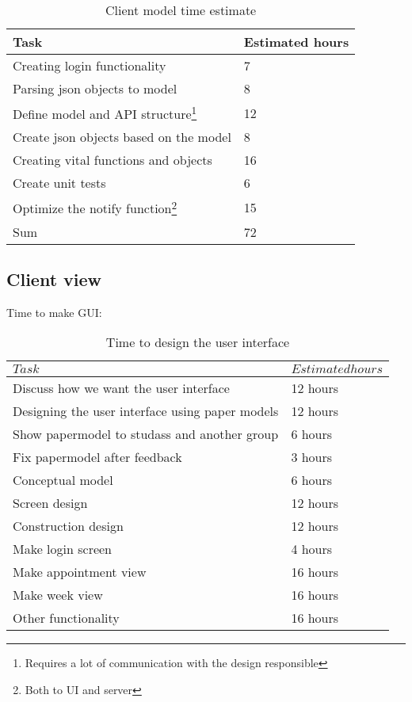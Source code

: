 \documentclass[a4paper, english, 12pt]{article}
\begin{document}
 \begin{table}[h]
    \begin{center}
    \caption{Client model time estimate} 
    \label{clientmodel}
    \vspace{0,5cm}
    \begin{tabular}{ll} \\ 
        \hline
        Task & Estimated hours\\
        \hline 
	Creating login functionality & 7 \\
	Parsing json objects to model & 8 \\
	Define model and API structure\footnote{Requires a lot of communication with the design responsible}  & 12\\
	Create json objects based on the model & 8 \\
	Creating vital functions and objects & 16 \\
	Create unit tests & 6 \\
	Optimize the notify function\footnote{Both to UI and server} & 15 \\	
        \hline
	Sum & 72\\
	\hline
    \end{tabular}
    \end{center}
\end{table}



\subsection{Client view}
Time to make GUI:

\begin{table}[h]
    \begin{center}
    \caption{Time to design the user interface} 
    \label{UI}
    \vspace{0,5cm}
    \begin{tabular}{ll} \\ 
        \hline
        $Task$ & $Estimated hours$\\
        \hline 
    Discuss how we want the user interface & 12 hours\\
    Designing the user interface using paper models & 12 hours\\    
    Show papermodel to studass and another group & 6 hours\\
    Fix papermodel after feedback & 3 hours\\
    Conceptual model & 6 hours\\
    Screen design & 12 hours\\
    Construction design & 12 hours\\
    Make login screen & 4 hours\\
    Make appointment view & 16 hours\\
    Make week view & 16 hours\\
    Other functionality & 16 hours\\
        \hline
    \end{tabular}
    \end{center}
\end{table}
\end{document}
